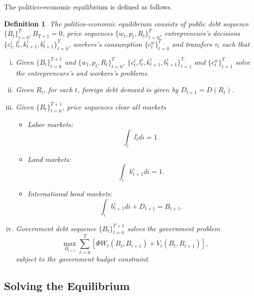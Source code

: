 \documentclass[twoside,11pt,leqno]{article}
\newtheorem{definition}{Definition}
\begin{document}
The politico-economic equilibrium is defined as follows.
\begin{definition}
The politico-economic equilibrium consists of public debt sequence $\{B_t\}_{t=0}^T, B_{T+1} = 0$, price sequences $\{w_t, p_t, R_t\}_{t=0}^T$, entrepreneurs's decisions $\{c_t^i, l_t^i, k_{t+1}^i, b_{t+1}^i\}_{t=0}^T$, workers's consumption $\{c^w_t\}_{t=0}^T$ and transfers $\tau_t$ such that
\begin{enumerate}[(i)]
    \item
    Given $\{B_{t}\}_{t=0}^{T+1}$ and $\{w_{t},p_{t},R_{t}\}_{t=0}^T$, $\{c^i_{t},l^i_{t},k^i_{t+1},b^i_{t+1}\}_{t=1}^T$ and $\{c^w_{t}\}_{t=1}^T$ solve the entrepreneurs's and workers's problems.
    \item
    Given $R_t$, for each $t$, foreign debt demand is given by $D_{t+1} = D(R_t)$.
    \item
    Given $\{B_{t}\}_{t=0}^{T+1}$, price sequences clear all markets
    \begin{itemize}
        \item
        Labor markets:
        \begin{equation*}
            \int_i l^i_{t} di = 1.
        \end{equation*}
        \item
        Land markets:
        \begin{equation*}
            \int_i k^i_{t+1} di = 1.
        \end{equation*}
        \item
        International bond markets:
        \begin{equation*}
            \int_i b_{t+1}^i di + D_{t+1} = B_{t+1}.
        \end{equation*}
    \end{itemize}
    \item
    Government debt sequence $\{B_{t}\}_{t=0}^{T+1}$ solves the government problem
    \begin{equation*}
        \max_{B_{t+1}} \sum_{t=0}^T \left[ \Phi W_t(B_t,B_{t+1}) + V_t(B_t,B_{t+1}) \right],
    \end{equation*}
    subject to the government budget constraint.
\end{enumerate}
\end{definition}

\subsection{Solving the Equilibrium}
\end{document}
